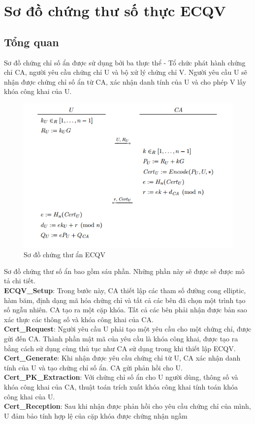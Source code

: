 \documentclass[a4paper,12pt]{report}
\begin{document}
\section{Sơ đồ chứng thư số thực ECQV}
\subsection{Tổng quan}
Sơ đồ chứng chỉ số ẩn được sử dụng bởi ba thực thể - Tổ chức phát hành chứng chỉ CA, người yêu cầu chứng chỉ U và bộ xử lý chứng chỉ V. Người yêu cầu U sẽ nhận được chứng chỉ số ẩn từ CA, xác nhận danh tính của U và cho phép V lấy khóa công khai của U. 
\begin{figure}[h]\label{h3.1}
\begin{center}
\includegraphics[scale=0.9]{../im8.png}
\caption{Sơ đồ chứng thư ẩn ECQV}
\end{center}
\end{figure}

Sơ đồ chứng thư số ẩn bao gồm sáu phần. Những phần này sẽ được sẽ được mô tả chi tiết.\\
\textbf{ECQV\_Setup}: Trong bước này, CA thiết lập các tham số đường cong elliptic, hàm băm, định dạng mã hóa chứng chỉ và tất cả các bên đã chọn một trình tạo số ngẫu nhiên. CA tạo ra một cặp khóa. Tất cả các bên phải nhận được bản sao xác thực các thông số và khóa công khai của CA. \\[6pt]
\textbf{Cert\_Request}: Người yêu cầu U phải tạo một yêu cầu cho một chứng chỉ, được gửi đến CA. Thành phần mật mã của yêu cầu là khóa công khai, được tạo ra bằng cách sử dụng cùng thủ tục như CA sử dụng trong khi thiết lập ECQV. \\ [6pt]
\textbf{Cert\_Generate}: Khi nhận được yêu cầu chứng chỉ từ U, CA xác nhận danh tính của U và tạo chứng chỉ số ẩn. CA gửi phản hồi cho U. \\ [6pt]
\textbf{Cert\_PK\_Extraction}: Với chứng chỉ số ẩn cho U người dùng, thông số và khóa công khai của CA, thuật toán trích xuất khóa công khai tính toán khóa công khai của U. \\ [6pt]
\textbf{Cert\_Reception}: Sau khi nhận được phản hồi cho yêu cầu chứng chỉ của mình, U đảm bảo tính hợp lệ của cặp khóa được chứng nhận ngầm
\end{document}
